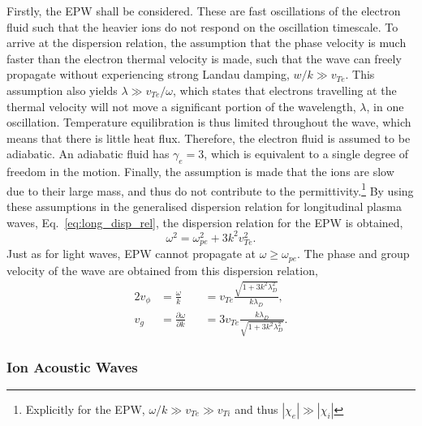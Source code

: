 Firstly, the \ac{EPW} shall be considered.
These are fast oscillations of the electron fluid such that the heavier ions do not respond on the oscillation timescale.
To arrive at the dispersion relation, the assumption that the phase velocity is much faster than the electron thermal velocity is made, such that the wave can freely propagate without experiencing strong Landau damping, $w/k \gg v_{Te}$.
This assumption also yields $\lambda \gg v_{Te}/\omega$, which states that electrons travelling at the thermal velocity will not move a significant portion of the wavelength, $\lambda$, in one oscillation.
Temperature equilibration is thus limited throughout the wave, which means that there is little heat flux.
Therefore, the electron fluid is assumed to be adiabatic.
An adiabatic fluid has $\gamma_e=3$, which is equivalent to a single degree of freedom in the motion.
Finally, the assumption is made that the ions are slow due to their large mass, and thus do not contribute to the permittivity.\footnote{Explicitly for the \ac{EPW}, $\omega/k \gg v_{Te} \gg v_{Ti}$ and thus $|\chi_e| \gg |\chi_i|$}
By using these assumptions in the generalised dispersion relation for longitudinal plasma waves, Eq.~\ref{eq:long_disp_rel}, the dispersion relation for the \ac{EPW} is obtained,
\begin{equation}
    \omega^2 = \omega_{pe}^2 + 3k^2v_{Te}^2.
\end{equation}
Just as for light waves, \ac{EPW} cannot propagate at $\omega\geq\omega_{pe}$.
The phase and group velocity of the wave are obtained from this dispersion relation,
\begin{alignat}{2}
    v_\phi &= \frac{\omega}{k} &&= v_{Te}\frac{\sqrt{1+3k^2\lambda_{D}^2}}{k\lambda_D},\\
    v_g &= \frac{\partial \omega}{\partial k} &&= 3v_{Te}\frac{k\lambda_D}{\sqrt{1+3k^2\lambda_{D}^2}}.
\end{alignat}

\subsubsection{Ion Acoustic Waves}%
\label{sec:theory_IAWs}

